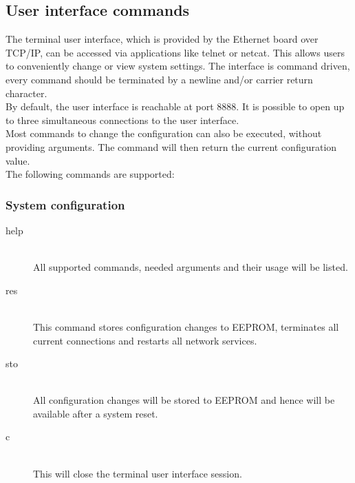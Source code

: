\documentclass[a4paper]{scrreprt}
\begin{document}
\subsection{User interface commands}
\label{sec:uicmd}
The terminal user interface, which is provided by the Ethernet board over TCP/IP, can be accessed via applications like telnet or netcat.
This allows users to conveniently change or view system settings. The interface is command driven, every command should be terminated
by a newline and/or carrier return character.\\
By default, the user interface is reachable at port 8888.
It is possible to open up to three simultaneous connections to the user interface.\\
Most commands to change the configuration can also be executed, without providing
arguments. The command will then return the current configuration value.\\
The following commands are supported:
\subsubsection{System configuration}
\begin{description}
  \item[help]\hspace{1cm}\\
    All supported commands, needed arguments and their usage will be listed.
  \item[res]\hspace{1cm}\\
    This command stores configuration changes to EEPROM, terminates all current connections and restarts all network
    services.
  \item[sto]\hspace{1cm}\\
    All configuration changes will be stored to EEPROM and hence will be available
    after a system reset.
  \item[c]\hspace{1cm}\\
    This will close the terminal user interface session.
\end{description}
\end{document}
